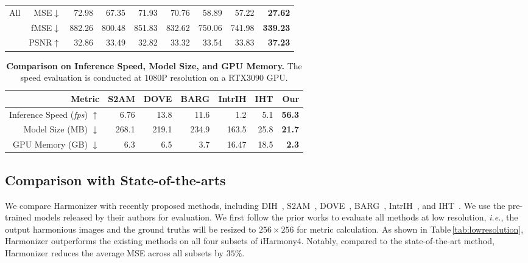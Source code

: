 \documentclass[runningheads]{llncs}
\begin{document}
\begin{table*}[ht]
\begin{center}
\begin{tabular}{c|r|rrrrrr|r}
\midrule
\multirow{3}{*}{All}
& MSE$\downarrow$  &  72.98 &  67.35 &  71.93 &  70.76 &  58.89 &  57.22 &  \textbf{27.62} \\
& fMSE$\downarrow$ & 882.26 & 800.48 & 851.83 & 832.62 & 750.06 & 741.98 & \textbf{339.23} \\
& PSNR$\uparrow$   &  32.86 &  33.49 &  32.82 &  33.32 &  33.54 &  33.83 &  \textbf{37.23} \\
\bottomrule
\end{tabular}
\vspace{-0.2cm}
\end{center}
\end{table*}





\begin{table*}[t]
  \begin{center}
    \caption{\textbf{Comparison on Inference Speed, Model Size, and GPU Memory.} The speed evaluation is conducted at 1080P resolution on a RTX3090 GPU.}\label{tab:other}
\setlength{\tabcolsep}{5pt}
\scriptsize
\begin{tabular}{r|rrrrr|r}
\toprule
Metric & S2AM\cite{S2AM} & DOVE\cite{DoveNet} & BARG\cite{BargainNet} & IntrIH\cite{IntrinsicIH} & IHT\cite{TransformerIH} &\;\;\;\; Our \\
\midrule
Inference Speed ({\it fps}) $\uparrow$     & 6.76  & 13.8 & 11.6 & 1.2 & 5.1 & \textbf{56.3} \\
Model Size (MB) $\downarrow$              &  268.1  & 219.1 & 234.9 & 163.5 & 25.8 & \textbf{21.7} \\
GPU Memory (GB) $\downarrow$             & 6.3 & 6.5 & 3.7 & 16.47 & 18.5 & \textbf{2.3} \\
\bottomrule
\end{tabular}
\vspace{-0.5cm}
\end{center}
\end{table*}

\subsection{Comparison with State-of-the-arts}\label{sec:4_1}
We compare Harmonizer with recently proposed methods, including DIH~\cite{DIH}, S2AM~\cite{S2AM}, DOVE~\cite{DoveNet}, BARG~\cite{BargainNet}, IntrIH~\cite{IntrinsicIH}, and IHT~\cite{TransformerIH}. We use the pre-trained models released by their authors for evaluation. We first follow the prior works to evaluate all methods at low resolution, {\it i.e.}, the output harmonious images and the ground truths will be resized to $256\times256$ for metric calculation. As shown in Table\,\ref{tab:lowresolution}, Harmonizer outperforms the existing methods on all four subsets of iHarmony4. Notably, compared to the state-of-the-art method, Harmonizer reduces the average MSE across all subsets by $35\%$.
\end{document}
